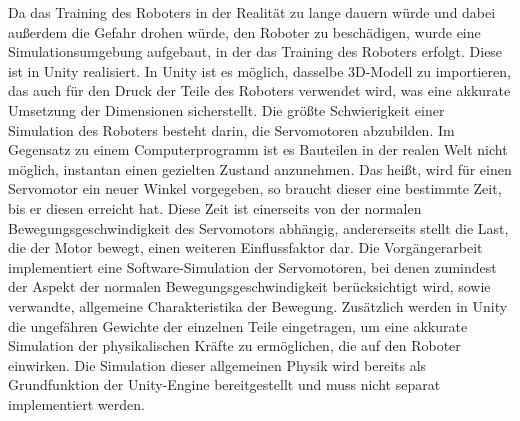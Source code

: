 Da das Training des Roboters in der Realität zu lange dauern würde und dabei außerdem die Gefahr drohen würde, den Roboter zu beschädigen, wurde eine Simulationsumgebung aufgebaut, in der das Training des Roboters erfolgt.
Diese ist in Unity realisiert.
In Unity ist es möglich, dasselbe 3D-Modell zu importieren, das auch für den Druck der Teile des Roboters verwendet wird, was eine akkurate Umsetzung der Dimensionen sicherstellt.
Die größte Schwierigkeit einer Simulation des Roboters besteht darin, die Servomotoren abzubilden.
Im Gegensatz zu einem Computerprogramm ist es Bauteilen in der realen Welt nicht möglich, instantan einen gezielten Zustand anzunehmen.
Das heißt, wird für einen Servomotor ein neuer Winkel vorgegeben, so braucht dieser eine bestimmte Zeit, bis er diesen erreicht hat.
Diese Zeit ist einerseits von der normalen Bewegungsgeschwindigkeit des Servomotors abhängig, andererseits stellt die Last, die der Motor bewegt, einen weiteren Einflussfaktor dar.
Die Vorgängerarbeit implementiert eine Software-Simulation der Servomotoren, bei denen zumindest der Aspekt der normalen Bewegungsgeschwindigkeit berücksichtigt wird, sowie verwandte, allgemeine Charakteristika der Bewegung. \cite[37]{waidner.2020}
Zusätzlich werden in Unity die ungefähren Gewichte der einzelnen Teile eingetragen, um eine akkurate Simulation der physikalischen Kräfte zu ermöglichen, die auf den Roboter einwirken.
Die Simulation dieser allgemeinen Physik wird bereits als Grundfunktion der Unity-Engine bereitgestellt und muss nicht separat implementiert werden.

    

